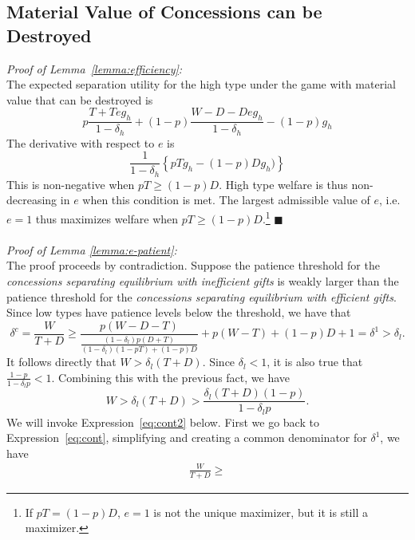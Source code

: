 \documentclass[12pt, letterpaper]{article}
\newcommand{\de}{\delta}
\begin{document}
{\subsection{Material Value of Concessions can be Destroyed}
\emph{Proof of Lemma~\ref{lemma:efficiency}:}\\
The expected separation utility for the high type under the game with material value that can be destroyed is
$$p\frac{T+Teg_h}{1-\de_h} + (1-p)\frac{W-D-Deg_h}{1-\de_h} - (1-p)g_h$$
The derivative with respect to $e$ is
$$\frac{1}{1-\de_h}\left\{pTg_h - (1-p)Dg_h)\right\}$$
This is non-negative when $pT \geq (1-p)D$. High type welfare is thus non-decreasing in $e$ when this condition is met.  The largest admissible value of $e$, i.e. $e=1$ thus maximizes welfare when $pT \geq (1-p)D$.\footnote{If $pT = (1-p)D$, $e=1$ is not the unique maximizer, but it is still a maximizer.} \hfill $\blacksquare$\\
\\
\emph{Proof of Lemma \ref{lemma:e-patient}:}\\
The proof proceeds by contradiction. Suppose the patience threshold for the \emph{concessions separating equilibrium with inefficient gifts} is weakly larger than the patience threshold for the \emph{concessions separating equilibrium with efficient gifts}. Since low types have patience levels below the threshold, we have that 
\begin{equation}
	\de^c = \frac{W}{T+D} \geq \frac{p(W-D-T)}{\frac{\left(1-\de_l\right)p\left(D +	 T\right)}{\left(1-\de_l\right)\left(1 - pT \right) + (1-p) D}} + p (W-T) + (1-p)D + 1 = \de^1> \de_l.
	\label{eq:cont}
\end{equation}
It follows directly that $W > \de_l(T+D)$. Since $\de_l < 1$, it is also true that $\frac{1-p}{1-\de_l p} < 1$. Combining this with the previous fact, we have
\begin{equation}
	W > \de_l(T+D) > \frac{\de_l(T+D)(1-p)}{1-\de_l p}.
	\label{eq:cont2}
\end{equation}
We will invoke Expression~\ref{eq:cont2} below. First we go back to Expression~\ref{eq:cont}, simplifying and creating a common denominator for $\de^1$, we have
\begin{multline*}
	\frac{W}{T+D} \geq %

\end{multline*}}
\end{document}
